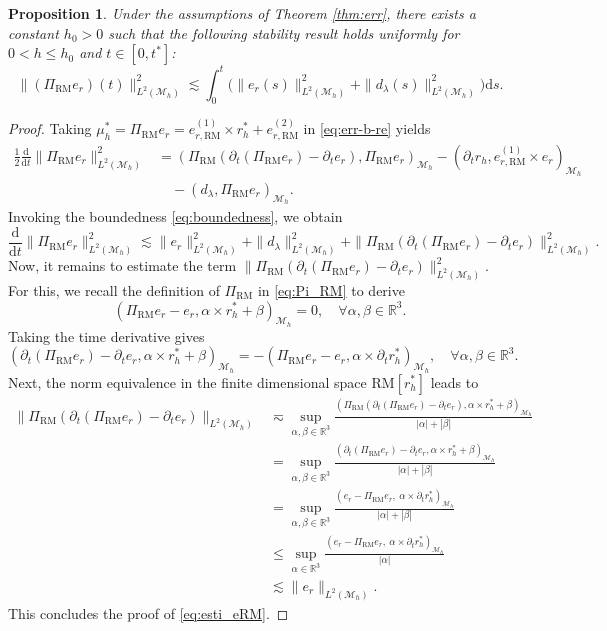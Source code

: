 \documentclass[11pt,a4paper,oneside,reqno]{amsart}
\theoremstyle{definition}
\theoremstyle{plain}
\newtheorem{proposition}{Proposition}
\numberwithin{theorem}{section}
\numberwithin{proposition}{section}
\numberwithin{lemma}{section}
\numberwithin{equation}{section}
\newcommand{\Man}{\mathcal{M}}
\newcommand{\RM}{\mathrm{RM}}
\begin{document}
\begin{proposition}\label{prop:esti_eRM}
    Under the assumptions of Theorem \ref{thm:err}, there exists a constant $h_0 > 0$ such that the following stability result holds uniformly for $0<h\leq h_0$ and $t\in[0,t^{*}]${\rm:}
    \begin{equation}\label{eq:esti_eRM} 
      \|  (\Pi_{\RM} e_r)(t)\|_{L^2(\Man_h)}^2  \lesssim \int_0^t \big(\|e_r(s)\|_{L^2(\Man_h)}^2 + \|d_\lambda(s)\|_{L^2(\Man_h)}^2\big)\mathrm{d}s.
    \end{equation} 
\end{proposition}
\begin{proof}
    Taking $\mu_h^* =  \Pi_{\RM} e_r =   e_{r, \RM}^{(1)} \times r_h^* +  e_{r, \RM}^{(2)}$ in \eqref{eq:err-b-re} yields 
\[ \begin{aligned}
        \frac{1}{2} \frac{\mathrm{d}}{\mathrm{d}t} 
    \| \Pi_{\RM} e_r\|_{L^2(\Man_h)}^2 &= (\Pi_{\RM}(\partial_t (\Pi_{\RM} e_r) - \partial_t e_r), \Pi_{\RM}e_r )_{\Man_h}
    - (\partial_t r_h,  e_{r,\RM}^{(1)} \times e_r)_{\Man_h} \\
    &\quad - (d_{\lambda},\Pi_{\RM}e_r )_{\Man_h}.
\end{aligned} \]
Invoking the boundedness \eqref{eq:boundedness}, we obtain 
\[   \frac{\mathrm{d}}{\mathrm{d}t} 
    \| \Pi_{\RM} e_r\|_{L^2(\Man_h)}^2
    \lesssim \| e_r \|_{L^2(\Man_h)}^2 + \|d_\lambda\|_{L^2(\Man_h)}^2 
    + \|\Pi_{\RM}(\partial_t (\Pi_{\RM} e_r) -\partial_t e_r)\|_{L^2(\Man_h)}^2.\]
Now, it remains to estimate the term $\| \Pi_{\RM}(\partial_t (\Pi_{\RM} e_r) - \partial_t e_r)\|_{L^2(\Man_h)}^2$. 
For this, we recall the definition of \( \Pi_{\RM} \) in \eqref{eq:Pi_RM} to derive
\[ ( \Pi_{\RM} e_r - e_r, \alpha \times r_h^* + \beta )_{\Man_h} = 0, \quad \forall \alpha,\beta \in \mathbb{R}^3.  \]    
Taking the time derivative gives 
\[ ( \partial_t(\Pi_{\mathrm{RM}} e_r) - \partial_t
e_r,\alpha \times r_h^* + \beta)_{\Man_h}
= - ( \Pi_{\mathrm{RM}} e_r - e_r,\alpha \times \partial_t r_h^* )_{\Man_h} , \quad \forall \alpha,\beta \in \mathbb{R}^3.  \]
Next, the norm equivalence in the finite dimensional space $\RM[r_h^*]$ leads to 
\[ 
\begin{aligned}
    \| \Pi_{\RM}(\partial_t (\Pi_{\RM} e_r) - \partial_te_r)\|_{L^2(\Man_h)} & \eqsim
\sup_{\alpha, \beta \in \mathbb{R}^3} \frac{(\Pi_{\RM}(\partial_t (\Pi_{\RM} e_r) -\partial_t e_r), \alpha \times r_h^* + \beta)_{\Man_h}}{|\alpha| + |\beta|}  \\ 
& = 
\sup_{\alpha, \beta \in \mathbb{R}^3} \frac{(\partial_t (\Pi_{\RM} e_r) -\partial_t e_r, \alpha \times r_h^* + \beta)_{\Man_h}}{|\alpha| + |\beta|}  \\ 
& = 
\sup_{\alpha, \beta \in \mathbb{R}^3} \frac{(  e_r - \Pi_{\mathrm{RM}}e_r,\ \alpha \times \partial_t r_h^* )_{\Man_h}}{|\alpha| + |\beta|} \\
&\le \sup_{\alpha \in \mathbb{R}^3} \frac{(  e_r - \Pi_{\mathrm{RM}}e_r,\ \alpha \times \partial_t r_h^* )_{\Man_h}}{|\alpha| }  \\
&
\lesssim \|e_r\|_{L^2(\Man_h)}.
\end{aligned}
\]
This concludes the proof of \eqref{eq:esti_eRM}. 
\end{proof}
\end{document}
